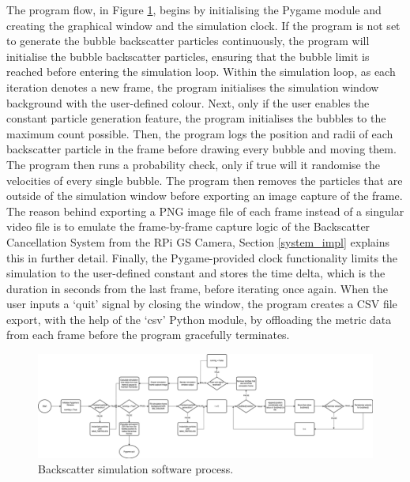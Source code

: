 The program flow, in Figure \ref{fig:simflow}, begins by initialising the Pygame module and creating the graphical window and the simulation clock. If the program is not set to generate the bubble backscatter particles continuously, the program will initialise the bubble backscatter particles, ensuring that the bubble limit is reached before entering the simulation loop. Within the simulation loop, as each iteration denotes a new frame, the program initialises the simulation window background with the user-defined colour. Next, only if the user enables the constant particle generation feature, the program initialises the bubbles to the maximum count possible. Then, the program logs the position and radii of each backscatter particle in the frame before drawing every bubble and moving them. The program then runs a probability check, only if true will it randomise the velocities of every single bubble. The program then removes the particles that are outside of the simulation window before exporting an image capture of the frame. The reason behind exporting a PNG image file of each frame instead of a singular video file is to emulate the frame-by-frame capture logic of the Backscatter Cancellation System from the RPi GS Camera, Section \ref{system_impl} explains this in further detail. Finally, the Pygame-provided clock functionality limits the simulation to the user-defined constant and stores the time delta, which is the duration in seconds from the last frame, before iterating once again. When the user inputs a `quit' signal by closing the window, the program creates a CSV file export, with the help of the `csv' Python module, by offloading the metric data from each frame before the program gracefully terminates.

\pagebreak
\begin{landscape}
    \begin{figure}
        \centering
        \includegraphics[width=1\linewidth]{assets/impl-sim_flow.png}
        \caption{Backscatter simulation software process.}
        \label{fig:simflow}
    \end{figure}
\end{landscape}
\pagebreak

